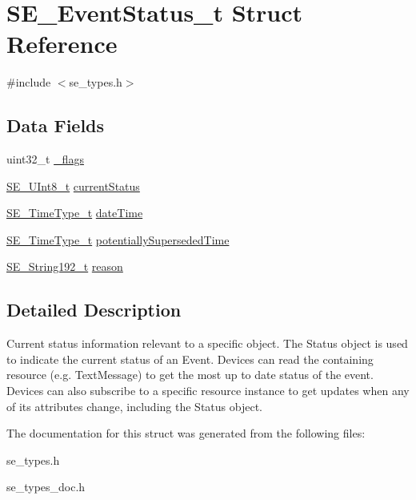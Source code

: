 \hypertarget{structSE__EventStatus__t}{}\section{S\+E\+\_\+\+Event\+Status\+\_\+t Struct Reference}
\label{structSE__EventStatus__t}


{\ttfamily \#include $<$se\+\_\+types.\+h$>$}

\subsection*{Data Fields}
\begin{DoxyCompactItemize}
\item 
uint32\+\_\+t \hyperlink{group__EventStatus_ga22ffd743b9bee41ded4925788c8bd778}{\+\_\+flags}
\item 
\hyperlink{group__UInt8_gaf7c365a1acfe204e3a67c16ed44572f5}{S\+E\+\_\+\+U\+Int8\+\_\+t} \hyperlink{group__EventStatus_ga59fc1cc6e5c19bf792c0b84e7e37a4e7}{current\+Status}
\item 
\hyperlink{group__TimeType_ga6fba87a5b57829b4ff3f0e7638156682}{S\+E\+\_\+\+Time\+Type\+\_\+t} \hyperlink{group__EventStatus_gaed58cdf8b3efb07a6241882255bc644c}{date\+Time}
\item 
\hyperlink{group__TimeType_ga6fba87a5b57829b4ff3f0e7638156682}{S\+E\+\_\+\+Time\+Type\+\_\+t} \hyperlink{group__EventStatus_ga54eb494ef98025237ddfd1959e20eecd}{potentially\+Superseded\+Time}
\item 
\hyperlink{group__String192_ga25f61da2bbbdfe30dbf77fcbb7edd7d7}{S\+E\+\_\+\+String192\+\_\+t} \hyperlink{group__EventStatus_ga30cb8c829f1f7458598572c159ccae98}{reason}
\end{DoxyCompactItemize}


\subsection{Detailed Description}
Current status information relevant to a specific object. The Status object is used to indicate the current status of an Event. Devices can read the containing resource (e.\+g. Text\+Message) to get the most up to date status of the event. Devices can also subscribe to a specific resource instance to get updates when any of its attributes change, including the Status object. 

The documentation for this struct was generated from the following files\+:\begin{DoxyCompactItemize}
\item 
se\+\_\+types.\+h\item 
se\+\_\+types\+\_\+doc.\+h\end{DoxyCompactItemize}
